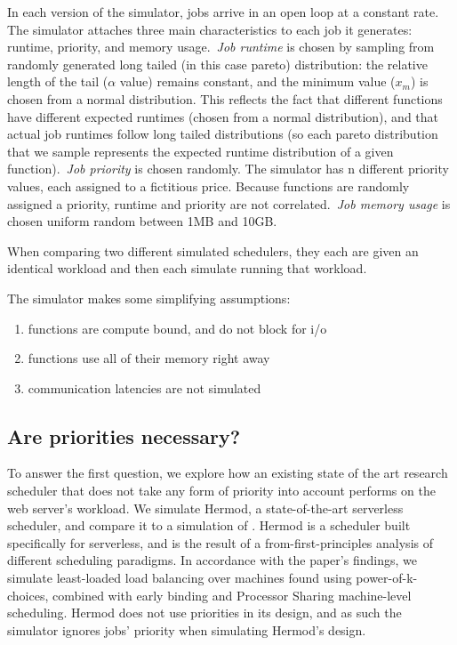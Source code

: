 In each version of the simulator, jobs arrive in an open loop at a constant
rate. The simulator attaches three main characteristics to each job it
generates: runtime, priority, and memory usage.\ \textit{Job runtime} is chosen
by sampling from randomly generated long tailed (in this case pareto)
distribution: the relative length of the tail ($\alpha$ value) remains constant,
and the minimum value ($x_m$) is chosen from a normal distribution. This
reflects the fact that different functions have different expected runtimes
(chosen from a normal distribution), and that actual job runtimes follow long
tailed distributions (so each pareto distribution that we sample represents the
expected runtime distribution of a given function).\ \textit{Job priority} is
chosen randomly. The simulator has n different priority values, each assigned to
a fictitious price. Because functions are randomly assigned a priority, runtime
and priority are not correlated.\ \textit{Job memory usage} is chosen uniform
random between 1MB and 10GB.

When comparing two different simulated schedulers, they each are given an
identical workload and then each simulate running that workload.

The simulator makes some simplifying assumptions:
\begin{enumerate}
    \item functions are compute bound, and do not block for i/o
    \item functions use all of their memory right away
    \item communication latencies are not simulated
\end{enumerate}


\subsection{Are priorities necessary?}

To answer the first question, we explore how an existing state of the art
research scheduler that does not take any form of priority into account performs
on the web server's workload. We simulate Hermod\cite{TODO}, a state-of-the-art
serverless scheduler, and compare it to a simulation of \sys{}. Hermod is a scheduler built specifically for serverless, and is
the result of a from-first-principles analysis of different scheduling
paradigms. In accordance with the paper's findings, we simulate least-loaded
load balancing over machines found using power-of-k-choices, combined with early
binding and Processor Sharing machine-level scheduling. Hermod
does not use priorities in its design, and as such the simulator ignores jobs'
priority when simulating Hermod's design.


